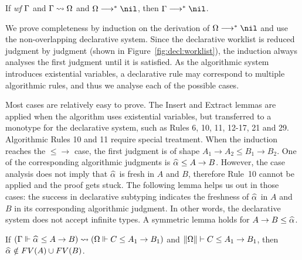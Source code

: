 \begin{theorem}[Completeness]
If \emph{wf }$\Gamma$ and $\Gamma\rightsquigarrow\Omega$ and $\Om\redto\nil$, then $\Gm \redto \nil$.
\label{thm:completeness}
\end{theorem}

We prove completeness by induction on the derivation of $\Om\redto\nil$
and use the non-overlapping declarative system.
Since the declarative worklist is reduced judgment by judgment
(shown in Figure~\ref{fig:decl:worklist}),
the induction always analyses the first judgment until it is satisfied.
As the algorithmic system introduces existential variables,
a declarative rule may correspond to multiple algorithmic rules,
and thus we analyse each of the possible cases.

Most cases are relatively easy to prove.
The Insert and Extract lemmas are applied when the algorithm uses existential variables,
but transferred to a monotype for the declarative system,
such as Rules 6, 10, 11, 12-17, 21 and 29.
Algorithmic Rules 10 and 11 require special treatment.
When the induction reaches the $\mathtt{{\le}{\to}}$ case,
the first judgment is of shape $A_1 \to A_2 \le B_1 \to B_2$.
One of the corresponding algorithmic judgments is $\al \le A \to B$.
However, the case analysis does not imply that $\al$ is fresh in $A$ and $B$,
therefore Rule~10 cannot be applied and the proof gets stuck.
The following lemma helps us out in those cases:
the success in declarative subtyping indicates the freshness of $\al$ in $A$ and $B$
in its corresponding algorithmic judgment.
In other words, the declarative system does not accept infinite types.
A symmetric lemma holds for $A\to B \le \al$.

\begin{lemma}\label{lem:prune_inst}
If $(\Gm \Vdash \al \le A \to B) \sto (\Om \Vdash C \le A_1 \to B_1)$ and
$\|\Omega\| \vdash C \le A_1 \to B_1$, then $\al\notin FV(A) \cup FV(B)$.
\end{lemma}

